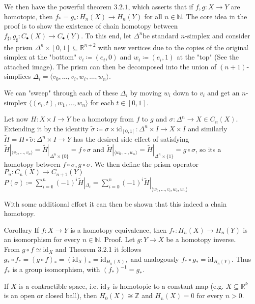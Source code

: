 We then have the powerful theorem \( 3.2.1 \), which asserts that if \( f,g : X \to Y \) are homotopic,
then \( f_{\ast} = g_{\ast} : H_n(X) \to H_n(Y) \) for all \( n \in \mathbb{N} \).
The core idea in the proof is to show the existence of chain homotopy between \( f_{\sharp},g_{\sharp} : C_\bullet(X) \to C_\bullet(Y) \).
To this end, let \( \Delta^n \)be standard \( n \)-simplex and consider the prism \(\Delta^n \times [0, 1] \subseteq \mathbb{R}^{n+2} \)
with new vertices due to the copies of the original simplex at the "bottom" \( v_i \coloneqq  (e_i, 0) \) and \( w_i \coloneqq  (e_i, 1) \) at the "top"
(See the attached image). The prism can then be decomposed into the union of \( (n+1) \)-simplices \( \Delta_i = \langle v_0, \dots, v_i, w_i, \dots, w_n \rangle \).

We can "sweep" through each of these \( \Delta_i \) by moving \( w_i \) down to \( v_i \) and get an \( n \)-simplex
\(\langle (e_i, t), w_1, \dots, w_n \rangle \) for each \( t \in [0, 1] \).

Let now \( H : X \times I \to Y\) be a homotopy from \( f \) to \( g \) and \( \sigma : \Delta^n \to X \in C_n(X) \).
Extending it by the identity \( \tilde{\sigma} \coloneqq \sigma \times \text{id}_{[0, 1]} : \Delta^n \times I \to X \times I \)
and similarly \( \tilde{H} = H \circ \tilde{\sigma} : \Delta^n \times I \to Y \) has the desired side effect of satisfying
\( \tilde{H}|_{\langle v_0, \dots, v_n\rangle} = \tilde{H}|_{\Delta^n \times \{0\}} = f \circ \sigma \) and 
\( \tilde{H}|_{\langle w_0, \dots, w_n\rangle} = \tilde{H}|_{\Delta^n \times \{1\}} = g \circ \sigma \),
so its a homotopy between \( f \circ \sigma, g \circ \sigma \). 
We then define the prism operator \( P_n : C_n(X) \to C_{n+1}(Y) \)
\( P(\sigma) \coloneqq \sum_{i=0}^n (-1)^i \tilde{H}|_{\Delta_i} = \sum_{i=0}^n (-1)^i \tilde{H}|_{\langle w_0, \dots, v_i, w_i, w_n\rangle}\)

With some additional effort it can then be shown that this indeed a chain homotopy.

Corollary
If \(f: X \to Y\) is a homotopy equivalence, then \(f_*: H_n(X) \to H_n(Y)\) is an isomorphism for every \(n \in \mathbb{N}\).
Proof. Let \(g: Y \to X\) be a homotopy inverse. From \(g \circ f \simeq \text{id}_X\) and Theorem 3.2.1 it follows
\(g_* \circ f_* = (g \circ f)_* = (\text{id}_X)_* = \text{id}_{H_n(X)},\)
and analogously \(f_* \circ g_* = \text{id}_{H_n(Y)}\). Thus \(f_*\) is a group isomorphism, with \((f_*)^{-1} = g_*\).

If \(X\) is a contractible space, i.e. \(\text{id}_X\) is homotopic to a constant map (e.g. \(X \subseteq \mathbb{R}^k\) is an open or closed ball), then \(H_0(X) \cong \mathbb{Z}\) and \(H_n(X) = 0\) for every \(n > 0\).

